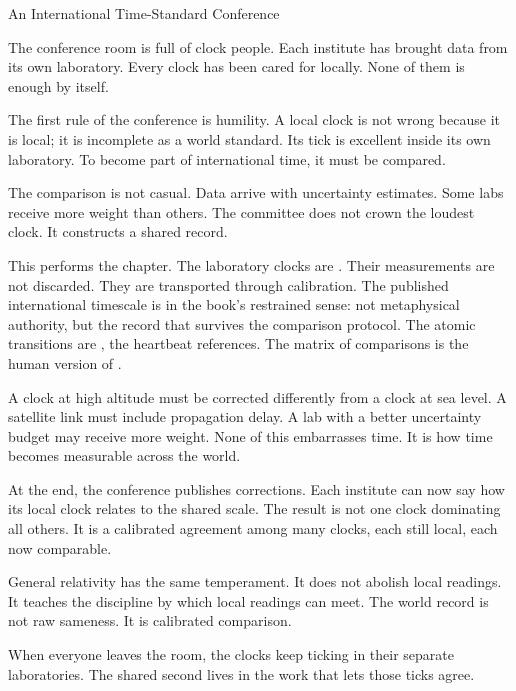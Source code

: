 \begin{coda}{An International Time-Standard Conference}

The conference room is full of clock people. Each institute has
brought data from its own laboratory. Every clock has been cared
for locally. None of them is enough by itself.

The first rule of the conference is humility. A local clock is not
wrong because it is local; it is incomplete as a world standard.
Its tick is excellent inside its own laboratory. To become part of
international time, it must be compared.

The comparison is not casual. Data arrive with uncertainty
estimates. Some labs receive more weight than others. The
committee does not crown the loudest clock. It constructs a shared
record.

This performs the chapter. The laboratory clocks are . Their
measurements are not discarded. They are transported through calibration. The
published international timescale is  in the book's restrained
sense: not metaphysical authority, but the record that survives the comparison
protocol. The atomic transitions are , the heartbeat references. The
matrix of comparisons is the human version of .

A clock at high altitude must be corrected differently from a clock at sea
level. A satellite link must include propagation delay. A lab with a better
uncertainty budget may receive more weight. None of this embarrasses time. It
is how time becomes measurable across the world.

At the end, the conference publishes corrections. Each institute can now say
how its local clock relates to the shared scale. The result is not one clock
dominating all others. It is a calibrated agreement among many clocks, each
still local, each now comparable.

General relativity has the same temperament. It does not abolish local
readings. It teaches the discipline by which local readings can meet. The
world record is not raw sameness. It is calibrated comparison.

When everyone leaves the room, the clocks keep ticking in their separate
laboratories. The shared second lives in the work that lets those ticks agree.

\end{coda}
